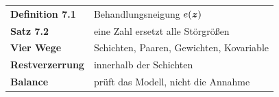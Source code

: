 \begin{merksatz}
\begin{center}
\renewcommand{\arraystretch}{1.5}
\begin{tabular}{@{}P{3.0cm}P{5.6cm}@{}}
\toprule
\textbf{Definition 7.1} & Behandlungsneigung $e(\boldsymbol{z})$\\
\textbf{Satz 7.2} & eine Zahl ersetzt alle Störgrößen\\
\textbf{Vier Wege} & Schichten, Paaren, Gewichten, Kovariable\\
\textbf{Restverzerrung} & innerhalb der Schichten\\
\textbf{Balance} & prüft das Modell, nicht die Annahme\\
\bottomrule
\end{tabular}
\end{center}

\begin{center}
\begin{minipage}{0.88\textwidth}
\end{minipage}
\end{center}
\end{merksatz}
